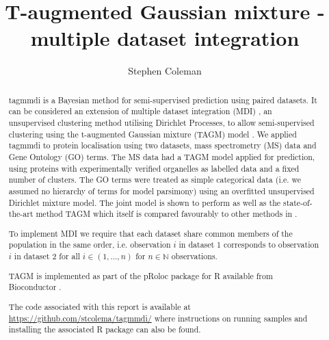 \documentclass[11pt]{article} %
\title{T-augmented Gaussian mixture - multiple dataset integration}
\author{Stephen Coleman}
\providecommand{\keywords}[1]
{
  \small	
  \textbf{\textit{Keywords---}} #1
}
\begin{document}
 \pgfplotsset{compat=1.16}
\maketitle

\begin{abstract}
tagmmdi is a Bayesian method for semi-supervised prediction using paired datasets. It can be considered an extension of multiple dataset integration (MDI) \cite{kirkBayesianCorrelatedClustering2012}, an unsupervised clustering method utilising Dirichlet Processes, to allow semi-supervised clustering using the t-augmented Gaussian mixture (TAGM) model \cite{CrookBayesianMixtureModelling2018a}. We applied tagmmdi to protein localisation using two datasets, mass spectrometry (MS) data and Gene Ontology (GO) terms. The MS data had a TAGM model applied for prediction, using proteins with experimentally verified organelles as labelled data and a fixed number of clusters. The GO terms were treated as simple categorical data (i.e. we assumed no hierarchy of terms for model parsimony) using an overfitted unsupervised Dirichlet mixture model. The joint model is shown to perform as well as the state-of-the-art method TAGM which itself is compared favourably to other methods in \citet{CrookBayesianMixtureModelling2018a}.

To implement MDI we require that each dataset share common members of the population in the same order, i.e. observation $i$ in dataset 1 corresponds to observation $i$ in dataset 2 for all $i \in (1, \ldots, n)$ for $n \in \mathbb{N}$ observations.

TAGM is implemented as part of the pRoloc package for R available from Bioconductor \cite{Breckelsbioconductorworkflowprocessing2016}.

The code associated with this report is available at \url{https://github.com/stcolema/tagmmdi/} where instructions on running samples and installing the associated R package can also be found.

\end{abstract}

\maketitle

\end{document}
